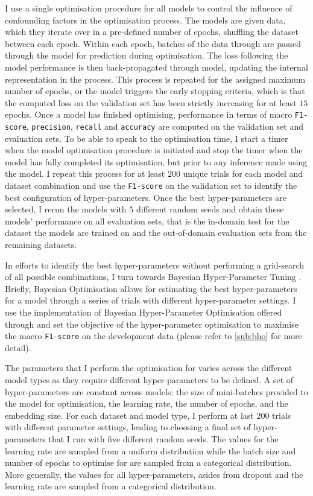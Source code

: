 I use a single optimisation procedure for all models to control the influence of confounding factors in the optimisation process.
The models are given data, which they iterate over in a pre-defined number of epochs, shuffling the dataset between each epoch. 
Within each epoch, batches of the data through are passed through the model for prediction during optimisation.
The loss following the model performance is then back-propagated through model, updating the internal representation in the process.
This process is repeated for the assigned maximum number of epochs, or the model triggers the early stopping \citep{Prechelt:1998} criteria, which is that the computed loss on the validation set has been strictly increasing for at least $15$ epochs.
Once a model has finished optimising, performance in terms of macro \texttt{F1-score}, \texttt{precision}, \texttt{recall} and \texttt{accuracy} are computed on the validation set and evaluation sets.
To be able to speak to the optimisation time, I start a timer when the model optimisation procedure is initiated and stop the timer when the model has fully completed its optimisation, but prior to any inference made using the model.
I repeat this process for at least $200$ unique trials for each model and dataset combination and use the \texttt{F1-score} on the validation set to identify the best configuration of hyper-parameters.
Once the best hyper-parameters are selected, I rerun the models with $5$ different random seeds and obtain these models' performance on all evaluation sets, that is the in-domain test for the dataset the models are trained on and the out-of-domain evaluation sets from the remaining datasets.

In efforts to identify the best hyper-parameters without performing a grid-search of all possible combinations, I turn towards Bayesian Hyper-Parameter Tuning \citep{Neal:1996}. 
Briefly, Bayesian Optimisation allows for estimating the best hyper-parameters for a model through a series of trials with different hyper-parameter settings. 
I use the implementation of Bayesian Hyper-Parameter Optimisation offered through \citet{Wandb} and set the objective of the hyper-parameter optimisation to maximise the macro \texttt{F1-score} on the development data (please refer to \cref{sub:bho} for more detail).

The parameters that I perform the optimisation for varies across the different model types as they require different hyper-parameters to be defined. 
A set of hyper-parameters are constant across models: the size of mini-batches provided to the model for optimisation, the learning rate, the number of epochs, and the embedding size. 
For each dataset and model type, I perform at last $200$ trials with different parameter settings, leading to choosing a final set of hyper-parameters that I run with five different random seeds.
The values for the learning rate are sampled from a uniform distribution while the batch size and number of epochs to optimise for are sampled from a categorical distribution. 
More generally, the values for all hyper-parameters, asides from dropout and the learning rate are sampled from a categorical distribution.

